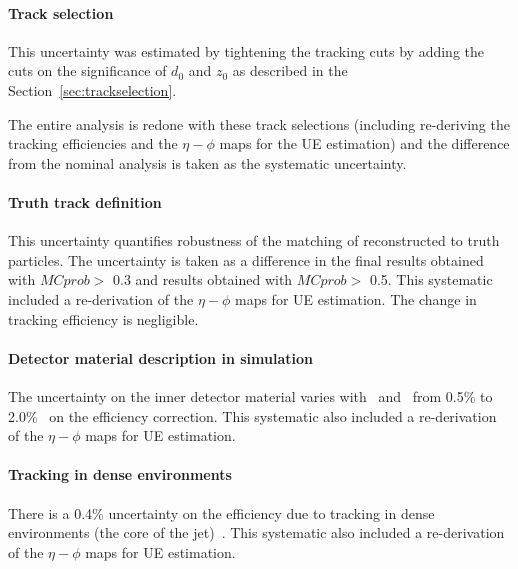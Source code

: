 \paragraph{Track selection}  This uncertainty was estimated by tightening the tracking cuts by adding the cuts
on the significance of $d_0$ and $z_0$ as described in the Section~\ref{sec:trackselection}.
 
The entire analysis is redone with these track selections (including re-deriving the tracking efficiencies and the $\eta-\phi$ maps for the UE estimation) and the difference from the nominal analysis is taken as the systematic uncertainty.





\paragraph{Truth track definition}  
This uncertainty quantifies robustness of the matching of reconstructed to truth particles.
The uncertainty is taken as a difference in the final results obtained with  $MCprob>$ 0.3 
and results obtained with $MCprob>$ 0.5.
This systematic included a re-derivation of the $\eta-\phi$ maps for UE estimation.
The change in tracking efficiency is negligible.


\paragraph{Detector material description in simulation}
The uncertainty on the inner detector material
varies with \pttrk\ and \etatrk\ from 0.5\% to 2.0\%~\cite{ref:tracktwiki} on the efficiency correction.
This systematic also included a re-derivation of the $\eta-\phi$ maps for UE estimation.


\paragraph{Tracking in dense environments}
There is a 0.4\% uncertainty on the efficiency due to tracking in dense environments (the core of the jet)~\cite{ref:tracktwiki}.
This systematic also included a re-derivation of the $\eta-\phi$ maps for UE estimation.


